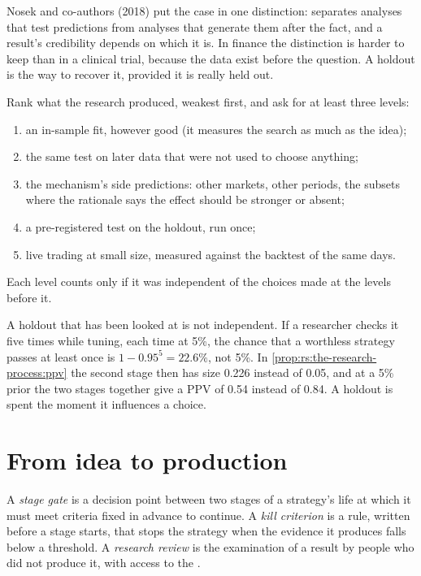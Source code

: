 Nosek and co-authors (2018) put the case in one distinction:  separates analyses that test predictions from
analyses that generate them after the fact, and a result's credibility depends on which it is. In finance the distinction is
harder to keep than in a clinical trial, because the data exist before the question. A holdout is the way to recover it,
provided it is really held out.

\begin{method}\label{met:rs:the-research-process:evidence}
Rank what the research produced, weakest first, and ask for at least three levels:
\begin{enumerate}
\item an in-sample fit, however good (it measures the search as much as the idea);
\item the same test on later data that were not used to choose anything;
\item the mechanism's side predictions: other markets, other periods, the subsets where the rationale says the effect should
be stronger or absent;
\item a pre-registered test on the holdout, run once;
\item live trading at small size, measured against the backtest of the same days.
\end{enumerate}
Each level counts only if it was independent of the choices made at the levels before it.
\end{method}

A holdout that has been looked at is not independent. If a researcher checks it five times while tuning, each time at 5\%,
the chance that a worthless strategy passes at least once is $1 - 0.95^5 = 22.6\%$, not 5\%. In
\cref{prop:rs:the-research-process:ppv} the second stage then has size 0.226 instead of 0.05, and at a 5\% prior the two stages
together give a PPV of 0.54 instead of 0.84. A holdout is spent the moment it influences a choice.

\section{From idea to production}

\begin{definition}\label{def:rs:the-research-process:gate}
A \emph{stage gate} is a decision point between two stages of a strategy's life at which it must meet
criteria fixed in advance to continue. A \emph{kill criterion} is a rule, written before a stage starts,
that stops the strategy when the evidence it produces falls below a threshold. A \emph{research review}
is the examination of a result by people who did not produce it, with access to the .
\end{definition}

